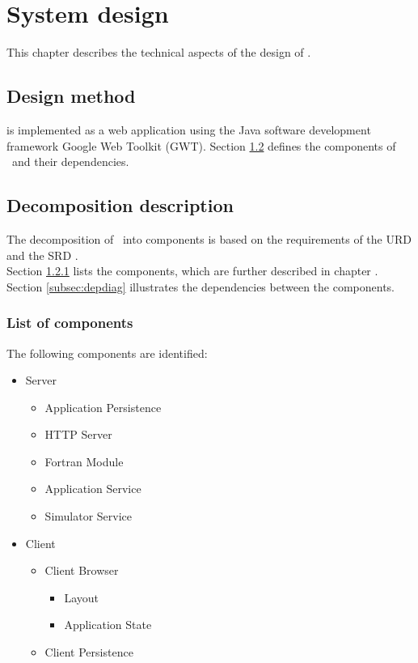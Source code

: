 \chapter{System design}
\label{chap:systdesign}
This chapter describes the technical aspects of the design of \projectname. \\

\section{Design method}
\projectname is implemented as a web application using the Java software development framework Google Web Toolkit (GWT). Section \ref{sec:decompdescr} defines the components of \projectname\ and their dependencies. \\


\section{Decomposition description}
\label{sec:decompdescr}
The decomposition of \projectname\ into components is based on the requirements of the URD \cite{urd} and the SRD \cite{srd}.\\
 Section \ref{subsec:complist} lists the components, which are further described in chapter \label{chap:compdescr}. Section \ref{subsec:depdiag} illustrates the dependencies between the components.

\subsection{List of components}
\label{subsec:complist}
The following components are identiﬁed:\\

\begin{itemize}
\item Server
\begin{itemize}
\item Application Persistence
\item HTTP Server
\item Fortran Module
\item Application Service
\item Simulator Service
\end{itemize}
\item Client
\begin{itemize}
\item Client Browser
\begin{itemize}
\item Layout
\item Application State
\end{itemize}
\item Client Persistence
\end{itemize}
\end{itemize}

